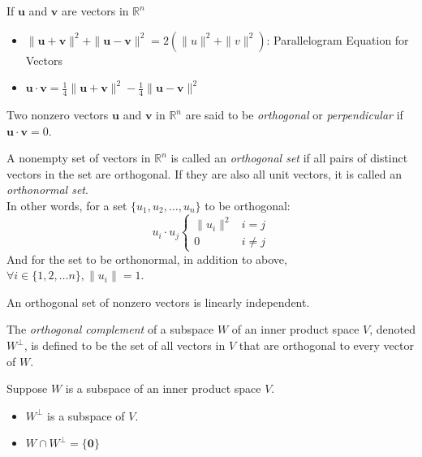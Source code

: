 \documentclass{report}
\begin{document}
		\begin{thm}
			If $\bm{u}$ and $\bm{v}$ are vectors in $\mathbb{R}^n$
			\begin{itemize}
				\item $\|\bm{u}+\bm{v}\|^2+\|\bm{u}-\bm{v}\|^2=2\left(\|u\|^2+\|v\|^2\right)$: Parallelogram Equation for Vectors
				\item $\bm{u}\cdot\bm{v}=\frac{1}{4}\|\bm{u}+\bm{v}\|^2-\frac{1}{4}\|\bm{u}-\bm{v}\|^2$
			\end{itemize}
		\end{thm}
		
		\begin{defn}
			Two nonzero vectors $\bm{u}$ and $\bm{v}$ in $\mathbb{R}^n$ are said to be \emph{orthogonal} or \emph{perpendicular} if $\bm{u} \cdot \bm{v} = 0$.
		\end{defn}
		
		\begin{defn}
			A nonempty set of vectors in $\mathbb{R}^n$ is called an \emph{orthogonal set} if all pairs of distinct vectors in the set are orthogonal. If they are also all unit vectors, it is called an \emph{orthonormal set}.\\
			In other words, for a set $\{u_1, u_2, \dots, u_n\}$ to be orthogonal:
			\begin{displaymath}
				u_i \cdot u_j
				\begin{cases}
					\|u_i\|^2 & i=j\\
					0 & i \ne j
				\end{cases}
			\end{displaymath}
			And for the set to be orthonormal, in addition to above, $\forall i \in \{1, 2, \dots n\}, \|u_i\|=1$.
		\end{defn}
		
		\begin{defn}
			An orthogonal set of nonzero vectors is linearly independent.
		\end{defn}
		
		\begin{defn}
			The \emph{orthogonal complement} of a subspace $W$ of an inner product space $V$, denoted $W^\perp$, is defined to be the set of all vectors in $V$ that are orthogonal to every vector of $W$.
		\end{defn}
		
		\begin{thm}
			Suppose $W$ is a subspace of an inner product space $V$.
			\begin{itemize}
				\item $W^\perp$ is a subspace of $V$.
				\item $W \cap W^\perp = \{\bm{0}\}$
			\end{itemize}
		\end{thm}
		
\end{document}
